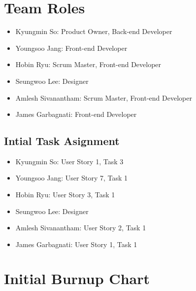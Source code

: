 \documentclass[10pt]{article}
\newcommand{\fancysecX}[2] {{\color{primary}\section*{#1} \label{sec:#2}}}
\newcommand{\fancysubX}[2] {{\color{primary}\subsection*{#1} \label{sec:#2}}}
\begin{document}
\fancysecX{Team Roles}{roles}

    \begin{itemize}
        \item Kyungmin So: Product Owner, Back-end Developer
        \item Youngsoo Jang: Front-end Developer
        \item Hobin Ryu: Scrum Master, Front-end Developer
        \item Seungwoo Lee: Designer
        \item Amlesh Sivanantham: Scrum Master, Front-end Developer
        \item James Garbagnati: Front-end Developer
    \end{itemize}

    \fancysubX{Intial Task Asignment}{intialtask}
        \begin{itemize}
            \item Kyungmin So: User Story 1, Task 3
            \item Youngsoo Jang: User Story 7, Task 1
            \item Hobin Ryu: User Story 3, Task 1
            \item Seungwoo Lee: Designer
            \item Amlesh Sivanantham: User Story 2, Task 1 
            \item James Garbagnati: User Story 1, Task 1
        \end{itemize}

\fancysecX{Initial Burnup Chart}{burnupchart}
\end{document}
